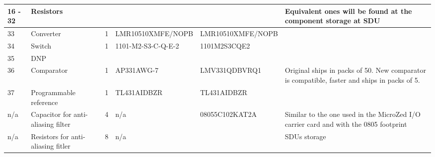 \begin{sidewaystable}
\begin{tabular}{|p{0.3cm}|p{2cm}|p{0.5cm}|l|l|p{5cm}|}
16 - 32 & Resistors              &          &                       &                       & Equivalent ones will be found at the component storage at SDU                                                                                                                                                \\ \hline
33      & Converter              & 1        & LMR10510XMFE/NOPB     & LMR10510XMFE/NOPB     &                                                                                                                                                                                                              \\ \hline
34      & Switch                 & 1        & 1101-M2-S3-C-Q-E-2    &  1101M2S3CQE2         &                                                                                                   \\ \hline
35      & DNP                    &          &                       &                       &                                                                                                                                                                                                              \\ \hline
36      & Comparator             & 1        & AP331AWG-7            & LMV331QDBVRQ1         & Original ships in packs of 50. New comparator is compatible, faster and ships in packs of 5.                                                                                                                 \\ \hline
37      & Programmable reference & 1        & TL431AIDBZR           & TL431AIDBZR           &                                                                                                                                                                                                              \\ \hline
n/a      	& Capacitor for anti-aliasing filter  & 4        & n/a           & 08055C102KAT2A           &  Similar to the one used in the MicroZed I/O carrier card and with the 0805 footprint                                                                                                                                                                                                      \\ \hline
n/a      	& Resistors for anti-aliasing fitler  & 8        & n/a           &            &  SDUs storage                                                                                                                                                                                                     \\ \hline


\end{tabular}
\end{sidewaystable}
